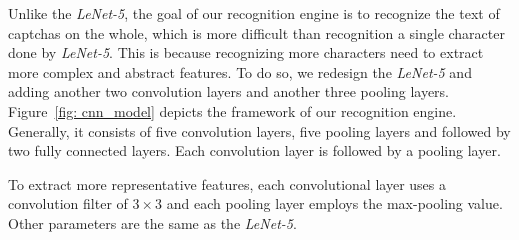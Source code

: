 Unlike the \emph{LeNet-5}, the goal of our recognition engine is to recognize the text of captchas on the whole, which is more difficult than recognition a single character done by \emph{LeNet-5}. This is because recognizing more characters need to extract more complex and abstract features.
To do so, we redesign the \emph{LeNet-5} and adding another two convolution layers and another three pooling layers.
Figure~\ref{fig: cnn_model} depicts the framework of our recognition engine. Generally, it consists of five convolution layers, five pooling layers and followed by two fully connected layers. Each convolution layer is followed by a pooling layer.

To extract more representative features, each convolutional layer uses a convolution filter of $3 \times 3$ and each pooling layer employs the max-pooling value. Other parameters are the same as the \emph{LeNet-5}.











